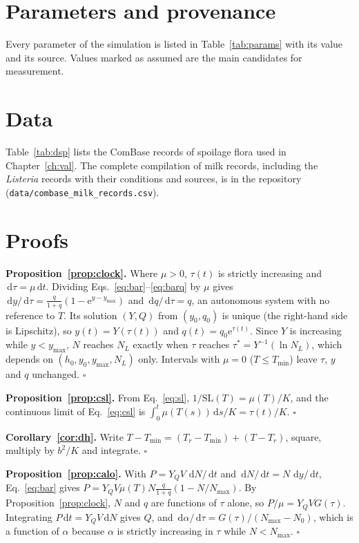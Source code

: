 \documentclass[11pt,a4paper,twoside,openany]{book}
\newcommand{\SL}{\mathrm{SL}}
\newcommand{\dd}{\,\mathrm{d}}
\theoremstyle{plain}\newtheorem{proposition}{Proposition}\newtheorem{corollary}{Corollary}
\theoremstyle{definition}\newtheorem{definition}{Definition}[chapter]
\begin{document}
\appendix
\chapter{Parameters and provenance}\label{app:params}
Every parameter of the simulation is listed in Table~\ref{tab:params} with its value and its source. Values marked as assumed are the main candidates for measurement.

\TabParams

\chapter{Data}\label{app:data}
Table~\ref{tab:dsp} lists the ComBase records of spoilage flora used in Chapter~\ref{ch:val}. The complete compilation of \DatNFull{} milk records, including the \DatNLis{} \textit{Listeria} records with their conditions and sources, is in the repository (\texttt{data/combase\_milk\_records.csv}).

\TabSpRecords

\chapter{Proofs}\label{app:proofs}
\textbf{Proposition~\ref{prop:clock}.} Where $\mu>0$, $\tau(t)$ is strictly increasing and $\dd\tau=\mu\dd t$. Dividing Eqs.~\eqref{eq:bar}--\eqref{eq:barq} by $\mu$ gives $\dd y/\dd\tau=\frac{q}{1+q}(1-\mathrm{e}^{y-y_{\max}})$ and $\dd q/\dd\tau=q$, an autonomous system with no reference to $T$. Its solution $(Y,Q)$ from $(y_0,q_0)$ is unique (the right-hand side is Lipschitz), so $y(t)=Y(\tau(t))$ and $q(t)=q_0\mathrm{e}^{\tau(t)}$. Since $Y$ is increasing while $y<y_{\max}$, $N$ reaches $N_L$ exactly when $\tau$ reaches $\tau^*=Y^{-1}(\ln N_L)$, which depends on $(h_0,y_0,y_{\max},N_L)$ only. Intervals with $\mu=0$ ($T\le T_{\min}$) leave $\tau$, $y$ and $q$ unchanged. \hfill$\square$

\textbf{Proposition~\ref{prop:csl}.} From Eq.~\eqref{eq:sl}, $1/\SL(T)=\mu(T)/K$, and the continuous limit of Eq.~\eqref{eq:csl} is $\int_0^t\mu(T(s))\dd s/K=\tau(t)/K$. \hfill$\square$

\textbf{Corollary~\ref{cor:dh}.} Write $T-T_{\min}=(T_r-T_{\min})+(T-T_r)$, square, multiply by $b^2/K$ and integrate. \hfill$\square$

\textbf{Proposition~\ref{prop:calo}.} With $P=Y_QV\,\dd N/\dd t$ and $\dd N/\dd t=N\,\dd y/\dd t$, Eq.~\eqref{eq:bar} gives $P=Y_QV\mu(T)N\frac{q}{1+q}(1-N/N_{\max})$. By Proposition~\ref{prop:clock}, $N$ and $q$ are functions of $\tau$ alone, so $P/\mu=Y_QVG(\tau)$. Integrating $P\dd t=Y_QV\dd N$ gives $Q$, and $\dd\alpha/\dd\tau=G(\tau)/(N_{\max}-N_0)$, which is a function of $\alpha$ because $\alpha$ is strictly increasing in $\tau$ while $N<N_{\max}$. \hfill$\square$
\end{document}
